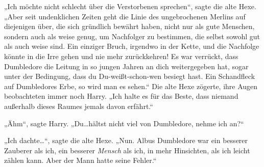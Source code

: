 „Ich möchte nicht schlecht über die Verstorbenen sprechen“, sagte die alte Hexe.
„Aber seit undenklichen Zeiten geht die Linie des ungebrochenen Merlins auf diejenigen über, die sich gründlich bewährt haben, nicht nur als gute Menschen, sondern auch als weise genug, um Nachfolger zu bestimmen, die selbst sowohl gut als auch weise sind. Ein einziger Bruch, irgendwo in der Kette, und die Nachfolge könnte in die Irre gehen und nie mehr zurückkehren! Es war verrückt, dass Dumbledore die Leitung in so jungen Jahren an dich weitergegeben hat, sogar unter der Bedingung, dass du Du-weißt-schon-wen besiegt hast. Ein Schandfleck auf Dumbledores Erbe, so wird man es sehen.“
Die alte Hexe zögerte, ihre Augen beobachteten immer noch Harry.
„Ich halte es für das Beste, dass niemand außerhalb dieses Raumes jemals davon erfährt.“

„Ähm“, sagte Harry. „Du…hältst nicht viel von Dumbledore, nehme ich an?“

„Ich dachte…“, sagte die alte Hexe. „Nun. Albus Dumbledore war ein besserer Zauberer als ich, ein besserer \emph{Mensch} als ich, in mehr Hinsichten, als ich leicht zählen kann. Aber der Mann hatte seine Fehler.“

